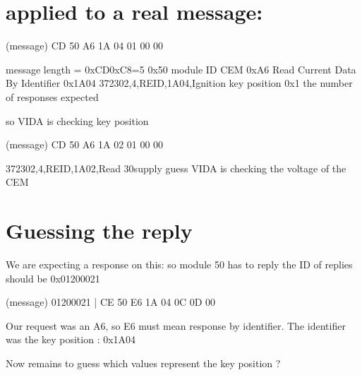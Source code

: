 \documentclass[letterpaper,10pt,english]{sphinxmanual}
\begin{document}
\section{applied to a real message:}
\label{\detokenize{volvo-diagnostic:applied-to-a-real-message}}
\sphinxAtStartPar
(message) CD 50 A6 1A 04 01 00 00

\begin{sphinxVerbatim}[commandchars=\\\{\}]
message length = 0xCD\PYGZhy{}0xC8=5
0x50 module ID CEM
0xA6 Read Current Data By Identifier
0x1A04 372302,4,REID,1A04,Ignition key position
0x1 the number of responses expected

so VIDA is checking key position
\end{sphinxVerbatim}

\sphinxAtStartPar
(message) CD 50 A6 1A 02 01 00 00

\begin{sphinxVerbatim}[commandchars=\\\{\}]
372302,4,REID,1A02,Read 30\PYGZhy{}supply
guess VIDA is checking the voltage of the CEM
\end{sphinxVerbatim}


\section{Guessing the reply}
\label{\detokenize{volvo-diagnostic:guessing-the-reply}}
\sphinxAtStartPar
We are expecting a response on this:
so module 50 has to reply
the ID of replies should be 0x01200021

\sphinxAtStartPar
(message) 01200021 | CE 50 E6 1A 04 0C 0D 00

\sphinxAtStartPar
Our request was an A6, so E6 must mean response by identifier.
The identifier was the key position : 0x1A04

\sphinxAtStartPar
Now remains to guess which values represent the key position ?
\end{document}
